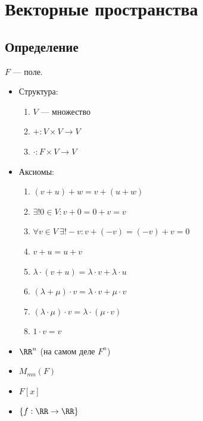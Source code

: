 \section{Векторные пространства}

\subsection{Определение}

\( F \) --- поле.

\begin{itemize}
    \item
        Структура:

        \begin{enumerate}
            \item
                \( V \) --- множество
            \item
                \( + : V \times V \to V \)
            \item
                \( \cdot : F \times V \to V \)
        \end{enumerate}
    \item
        Аксиомы:

        \begin{enumerate}[start = 4]
            \item
                \( (v + u) + w = v + (u + w) \)
            \item
                \( \exists ! 0 \in V : v + 0 = 0 + v = v \)
            \item
                \( \forall v \in V \ \exists ! -v : v + (-v) = (-v) + v = 0 \)
            \item
                \( v + u = u + v \)
            \item
                \( \lambda \cdot (v + u) = \lambda \cdot v + \lambda \cdot u \)
            \item
                \( (\lambda + \mu) \cdot v = \lambda \cdot v + \mu \cdot v \)
            \item
                \( (\lambda \cdot \mu) \cdot v = \lambda \cdot (\mu \cdot v) \)
            \item
                \( 1 \cdot v = v \)
        \end{enumerate}
\end{itemize}

\begin{example}{}{}
    \begin{itemize}
        \item
            \( \RR^n \) (на самом деле \( F^n \))
        \item
            \( M_{mn} (F) \)
        \item
            \( F[x] \)
        \item
            \( \{ f : \RR \to \RR \} \)
    \end{itemize}
\end{example}

